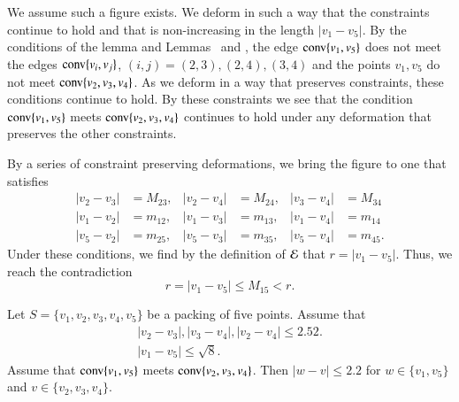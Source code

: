 \begin{tarskidata}
\begin{tarski}
\begin{proved}
We assume such a figure exists.  We deform in such a way that the constraints continue
to hold and that is non-increasing in the length $|v_1-v_5|$.  By the conditions of the
lemma and Lemmas~ and , 
the edge ${\operatorname{conv}}\{v_1,v_5\}$
does not meet the
 edges ${\operatorname{conv}}\{v_i,v_j\}$, $(i,j)=(2,3),(2,4),(3,4)$ 
and the points $v_1,v_5$
do not meet ${\operatorname{conv}}\{v_2,v_3,v_4\}$.  As we deform in a way that preserves constraints,
these conditions continue to hold.  By these constraints we see that the condition
  ${\operatorname{conv}}\{v_1,v_5\}$ meets ${\operatorname{conv}}\{v_2,v_3,v_4\}$
continues to hold under any deformation that preserves the other constraints.

By a series of constraint preserving deformations, we bring the figure to one that satisfies
	$$
	\begin{array}{rlrlrl}
	|v_2-v_3|&=M_{23}, &|v_2-v_4| &= M_{24}, &|v_3-v_4| &= M_{34}\\
	|v_1-v_2|&=m_{12}, &|v_1-v_3| &= m_{13}, &|v_1-v_4| &= m_{14}\\
	|v_5-v_2|&=m_{25}, &|v_5-v_3| &= m_{35}, &|v_5-v_4| &= m_{45}.
	\end{array}
	$$
Under these conditions, we find by the definition of ${\mathcal E}$ 
that $r = |v_1-v_5|$.  Thus, we reach the contradiction
	$$
	r = |v_1-v_5| \le M_{15} < r.
	$$
\swallowed\end{proved}
\end{tarski}





\begin{tarski}

\begin{lemma} 
Let $S=\{v_1,v_2,v_3,v_4,v_5\}$ be a packing of five points.
Assume that
	$$
	\begin{array}{lll}
	|v_2-v_3|, |v_3-v_4|, |v_2-v_4|\le 2.52.\\
	|v_1-v_5|\le \sqrt8.
	\end{array}
	$$
Assume that ${\operatorname{conv}}\{v_1,v_5\}$ meets ${\operatorname{conv}}\{v_2,v_3,v_4\}$.
Then $|w-v|\le 2.2$ for $w\in\{v_1,v_5\}$ and $v\in\{v_2,v_3,v_4\}$.
\end{lemma}


\end{tarski}
\end{tarskidata}
